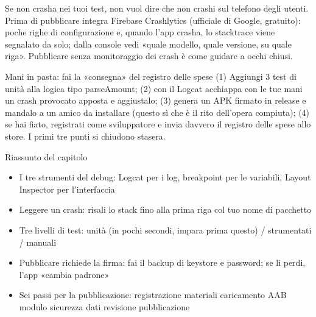 
Se non crasha nei tuoi test, non vuol dire che non crashi sul telefono degli utenti. Prima di pubblicare integra Firebase Crashlytics (ufficiale di Google, gratuito): poche righe di configurazione e, quando l'app crasha, lo stacktrace viene segnalato da solo; dalla console vedi «quale modello, quale versione, su quale riga». Pubblicare senza monitoraggio dei crash è come guidare a occhi chiusi.

\begin{tcbpractice}{Mani in pasta: fai la «consegna» del registro delle spese}
(1) Aggiungi 3 test di unità alla logica tipo parseAmount; (2) con il Logcat acchiappa con le tue mani un crash provocato apposta e aggiustalo; (3) genera un APK firmato in release e mandalo a un amico da installare (questo sì che è il rito dell'opera compiuta); (4) se hai fiato, registrati come sviluppatore e invia davvero il registro delle spese allo store. I primi tre punti si chiudono stasera.

\end{tcbpractice}

\begin{tcbsummary}{Riassunto del capitolo}
\begin{itemize}
  \item I tre strumenti del debug: Logcat per i log, breakpoint per le variabili, Layout Inspector per l'interfaccia
  \item Leggere un crash: risali lo stack fino alla prima riga col tuo nome di pacchetto
  \item Tre livelli di test: unità (in pochi secondi, impara prima questo) / strumentati / manuali
  \item Pubblicare richiede la firma: fai il backup di keystore e password; se li perdi, l'app «cambia padrone»
  \item Sei passi per la pubblicazione: registrazione materiali caricamento AAB modulo sicurezza dati revisione pubblicazione
\end{itemize}

\end{tcbsummary}
